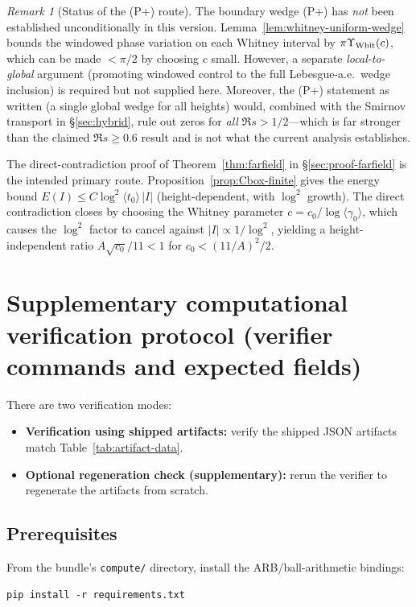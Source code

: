 \documentclass[11pt]{amsart}
\theoremstyle{definition}
\theoremstyle{remark}
\newtheorem{remark}[theorem]{Remark}
\newcommand{\angles}[1]{\langle #1\rangle}
\begin{document}
\begin{remark}[Status of the (P+) route]\label{thm:pplus-proof-complete}
The boundary wedge \textup{(P+)} has \emph{not} been established unconditionally in this version.
Lemma~\ref{lem:whitney-uniform-wedge} bounds the windowed phase variation on each Whitney interval
by \(\pi\Upsilon_{\rm Whit}(c)\), which can be made \(<\pi/2\) by choosing \(c\) small.
However, a separate \emph{local-to-global} argument
(promoting windowed control to the full Lebesgue-a.e.\ wedge inclusion)
is required but not supplied here.
Moreover, the (P+) statement as written (a single global wedge for all heights)
would, combined with the Smirnov transport in \S\ref{sec:hybrid},
rule out zeros for \emph{all} \(\Re s>1/2\)---which is far stronger than the claimed
\(\Re s\ge 0.6\) result and is not what the current analysis establishes.

The direct-contradiction proof of Theorem~\ref{thm:farfield} in \S\ref{sec:proof-farfield}
is the intended primary route.
Proposition~\ref{prop:Cbox-finite} gives the energy bound
\(E(I)\le C\log^2\!\angles{t_0}\,|I|\) (height-dependent, with \(\log^2\) growth).
The direct contradiction closes by choosing the Whitney parameter
\(c=c_0/\log\angles{\gamma_0}\), which causes the \(\log^2\) factor
to cancel against \(|I|\propto 1/\log^2\), yielding a height-independent
ratio \(A\sqrt{c_0}/11<1\) for \(c_0<(11/A)^2/2\).
\end{remark}

\section{Supplementary computational verification protocol (verifier commands and expected fields)}\label{app:verify}

There are two verification modes:
\begin{itemize}
\item \textbf{Verification using shipped artifacts:} verify the shipped JSON artifacts match Table~\ref{tab:artifact-data}.
\item \textbf{Optional regeneration check (supplementary):} rerun the verifier to regenerate the artifacts from scratch.
\end{itemize}

\subsection*{Prerequisites}
From the bundle's \texttt{compute/} directory, install the ARB/ball-arithmetic bindings:
\begin{verbatim}
pip install -r requirements.txt
\end{verbatim}
\end{document}
